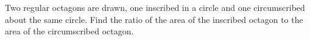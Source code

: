 Two regular octagons are drawn, one inscribed in a circle and one circumscribed about the same circle. Find the ratio of the area of the inscribed octagon to the area of the circumscribed octagon.

